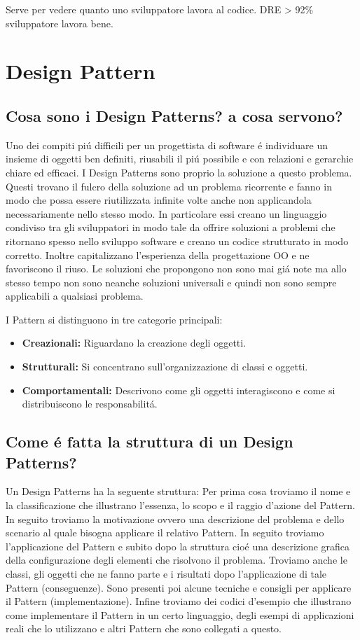\documentclass[11pt]{article}
\begin{document}
Serve per vedere quanto uno sviluppatore lavora al codice. DRE > 92\% sviluppatore lavora bene.
\section{Design Pattern}
\label{sec:org37f506d}
\subsection{Cosa sono i Design Patterns? a cosa servono?}
\label{sec:org94182b0}
Uno dei compiti piú difficili per un progettista di software é individuare un insieme di oggetti ben definiti, riusabili il piú possibile e con relazioni e gerarchie chiare ed efficaci.
I Design Patterns sono proprio la soluzione a questo problema.
Questi trovano il fulcro della soluzione ad un problema ricorrente e fanno in modo che possa essere riutilizzata infinite volte anche non applicandola necessariamente nello stesso modo.
In particolare essi creano un linguaggio condiviso tra gli sviluppatori in modo tale da offrire soluzioni a problemi che ritornano spesso nello sviluppo software e creano un codice strutturato in modo corretto.
Inoltre capitalizzano l'esperienza della progettazione OO e ne favoriscono il riuso.
Le soluzioni che propongono non sono mai giá note ma allo stesso tempo non sono neanche soluzioni universali e quindi non sono sempre applicabili a qualsiasi problema.

I Pattern si distinguono in tre categorie principali:
\begin{itemize}
\item \textbf{\textbf{Creazionali:}} Riguardano la creazione degli oggetti.
\item \textbf{\textbf{Strutturali:}} Si concentrano sull'organizzazione di classi e oggetti.
\item \textbf{\textbf{Comportamentali:}} Descrivono come gli oggetti interagiscono e come si distribuiscono le responsabilitá.
\end{itemize}
\subsection{Come é fatta la struttura di un Design Patterns?}
\label{sec:orga3df08a}
Un Design Patterns ha la seguente struttura:
Per prima cosa troviamo il nome e la classificazione che illustrano l'essenza, lo scopo e il raggio d'azione del Pattern.
In seguito troviamo la motivazione ovvero una descrizione del problema e dello scenario al quale bisogna applicare il relativo Pattern.
In seguito troviamo l'applicazione del Pattern e subito dopo la struttura cioé una descrizione grafica della configurazione degli elementi che risolvono il problema.
Troviamo anche le classi, gli oggetti che ne fanno parte e i risultati dopo l'applicazione di tale Pattern (conseguenze).
Sono presenti poi alcune tecniche e consigli per applicare il Pattern (implementazione).
Infine troviamo dei codici d'esempio che illustrano come implementare il Pattern in un certo linguaggio, degli esempi di applicazioni reali che lo utilizzano e altri Pattern che sono collegati a questo.
\end{document}
